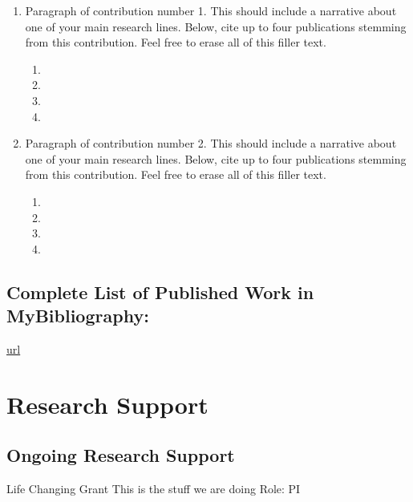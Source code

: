 \documentclass{nihbiosketch}
\begin{document}
\begin{enumerate}

\item Paragraph of contribution number 1. This should include a narrative about one of your main research lines. Below, cite up to four publications stemming from this contribution. Feel free to erase all of this filler text.

\begin{enumerate}
  \item {}
  \item {}
  \item {}
  \item {}
\end{enumerate}


\item Paragraph of contribution number 2. This should include a narrative about one of your main research lines. Below, cite up to four publications stemming from this contribution. Feel free to erase all of this filler text.

\begin{enumerate}
  \item {}
  \item {}
  \item {}
  \item {}
\end{enumerate}

\end{enumerate}



  \subsection*{Complete List of Published Work in MyBibliography:} 
  \url{url}

  \section{Research Support}
  
        \subsection*{Ongoing Research Support}
    
            
      {Life Changing Grant}
      {This is the stuff we are doing}
      {Role: PI}
      
\end{document}
